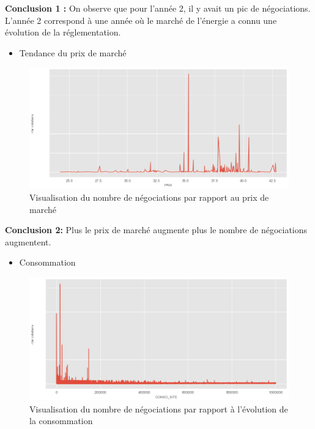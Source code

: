 \documentclass[12pt]{article}
\begin{document}
{%

{\bf Conclusion 1 :} On observe que pour l'année 2, il y avait un pic de négociations. L'année 2 correspond à une année où le marché de l'énergie a connu une évolution de la réglementation. 

\begin{itemize}
\item Tendance du prix de marché
\end{itemize}


\begin{figure}[H]
	\centering
    \includegraphics[width=1\textwidth]{image26.png}
     \caption{ Visualisation du nombre de négociations par rapport au prix de marché }
    \label{fig:26}
\end{figure}

{\bf Conclusion 2:} Plus le prix de marché augmente plus le nombre de négociations augmentent.

\begin{itemize}
\item Consommation
\end{itemize}


\begin{figure}[H]
	\centering
    \includegraphics[width=1\textwidth]{image27.png}
     \caption{ Visualisation du nombre de négociations par rapport à l'évolution de la consommation}
    \label{fig:27}
\end{figure}

}
\end{document}
